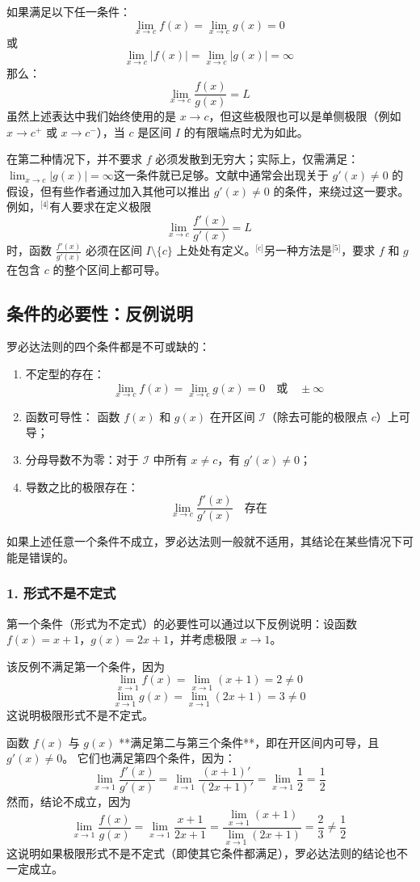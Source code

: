 如果满足以下任一条件：
$$
\lim_{x \to c} f(x) = \lim_{x \to c} g(x) = 0~
$$
或
$$
\lim_{x \to c} |f(x)| = \lim_{x \to c} |g(x)| = \infty ~
$$
那么：
$$
\lim_{x \to c} \frac{f(x)}{g(x)} = L~
$$
虽然上述表达中我们始终使用的是 $x \to c$，但这些极限也可以是单侧极限（例如 $x \to c^+$ 或 $x \to c^-$），当 $c$ 是区间 $I$ 的有限端点时尤为如此。

在第二种情况下，并不要求 $f$ 必须发散到无穷大；实际上，仅需满足：$\lim_{x \to c} |g(x)| = \infty$这一条件就已足够。文献中通常会出现关于 $g'(x) \ne 0$ 的假设，但有些作者通过加入其他可以推出 $g'(x) \ne 0$ 的条件，来绕过这一要求。例如，\(^\text{[4]}\)有人要求在定义极限
$$
\lim_{x \to c} \frac{f'(x)}{g'(x)} = L~
$$
时，函数 $\frac{f'(x)}{g'(x)}$ 必须在区间 $I \setminus \{c\}$ 上处处有定义。\(^\text{[c]}\)另一种方法是\(^\text{[5]}\)，要求 $f$ 和 $g$ 在包含 $c$ 的整个区间上都可导。
\subsection{条件的必要性：反例说明}
罗必达法则的四个条件都是不可或缺的：
\begin{enumerate}
\item 不定型的存在：
   $$
   \lim_{x \to c} f(x) = \lim_{x \to c} g(x) = 0 \quad \text{或} \quad \pm \infty~
   $$
\item 函数可导性：
   函数 $f(x)$ 和 $g(x)$ 在开区间 $\mathcal{I}$（除去可能的极限点 $c$）上可导；
\item 分母导数不为零：对于 $\mathcal{I}$ 中所有 $x \ne c$，有 $g'(x) \ne 0$；
\item 导数之比的极限存在：
   $$
   \lim_{x \to c} \frac{f'(x)}{g'(x)} \quad \text{存在}~
   $$
\end{enumerate}
如果上述任意一个条件不成立，罗必达法则一般就不适用，其结论在某些情况下可能是错误的。
\subsubsection{1. 形式不是不定式}
第一个条件（形式为不定式）的必要性可以通过以下反例说明：设函数$f(x) = x + 1$，$g(x) = 2x + 1$，并考虑极限 $x \to 1$。

该反例不满足第一个条件，因为
$$
\lim_{x \to 1} f(x) = \lim_{x \to 1} (x + 1) = 2 \neq 0~
$$
$$
\lim_{x \to 1} g(x) = \lim_{x \to 1} (2x + 1) = 3 \neq 0~
$$
这说明极限形式不是不定式。

函数 $f(x)$ 与 $g(x)$ **满足第二与第三个条件**，即在开区间内可导，且 $g'(x) \ne 0$。
它们也满足第四个条件，因为：
$$
\lim_{x \to 1} \frac{f'(x)}{g'(x)} = \lim_{x \to 1} \frac{(x + 1)'}{(2x + 1)'} =\lim_{x \to 1} \frac{1}{2} =\frac{1}{2}~
$$
然而，结论不成立，因为
$$
\lim_{x \to 1} \frac{f(x)}{g(x)} = \lim_{x \to 1} \frac{x + 1}{2x + 1} =\frac{\lim_{x \to 1}(x+1)}{\lim_{x \to 1}(2x+1)}= \frac{2}{3} \ne \frac{1}{2}~
$$
这说明如果极限形式不是不定式（即使其它条件都满足），罗必达法则的结论也不一定成立。
